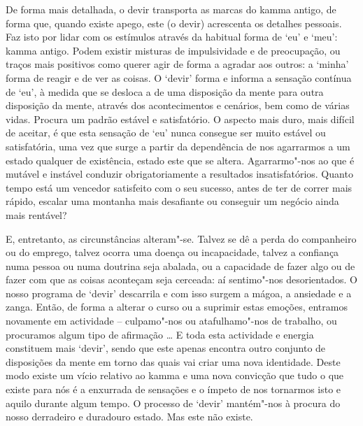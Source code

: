 De forma mais detalhada, o devir transporta as marcas do kamma antigo, de forma
que, quando existe apego, este (o devir) acrescenta os detalhes pessoais. Faz
isto por lidar com os estímulos através da habitual forma de `eu' e `meu': kamma
antigo. Podem existir misturas de impulsividade e de preocupação, ou traços mais
positivos como querer agir de forma a agradar aos outros: a `minha' forma de
reagir e de ver as coisas. O `devir' forma e informa a sensação contínua de
`eu', à medida que se desloca a de uma disposição da mente para outra disposição
da mente, através dos acontecimentos e cenários, bem como de várias vidas.
Procura um padrão estável e satisfatório. O aspecto mais duro, mais difícil de
aceitar, é que esta sensação de `eu' nunca consegue ser muito estável ou
satisfatória, uma vez que surge a partir da dependência de nos agarrarmos a um
estado qualquer de existência, estado este que se altera. Agarrarmo"-nos ao que
é mutável e instável conduzir obrigatoriamente a resultados insatisfatórios.
Quanto tempo está um vencedor satisfeito com o seu sucesso, antes de ter de
correr mais rápido, escalar uma montanha mais desafiante ou conseguir um negócio
ainda mais rentável?

E, entretanto, as circunstâncias alteram"-se. Talvez se dê a perda do
companheiro ou do emprego, talvez ocorra uma doença ou incapacidade, talvez a
confiança numa pessoa ou numa doutrina seja abalada, ou a capacidade de fazer
algo ou de fazer com que as coisas aconteçam seja cerceada: aí sentimo"-nos
desorientados. O nosso programa de `devir' descarrila e com isso surgem a mágoa,
a ansiedade e a zanga. Então, de forma a alterar o curso ou a suprimir estas
emoções, entramos novamente em actividade -- culpamo"-nos ou atafulhamo"-nos de
trabalho, ou procuramos algum tipo de afirmação \ldots{} E toda esta actividade
e energia constituem mais `devir', sendo que este apenas encontra outro conjunto
de disposições da mente em torno das quais vai criar uma nova identidade. Deste
modo existe um vício relativo ao kamma e uma nova convicção que tudo o que
existe para nós é a enxurrada de sensações e o ímpeto de nos tornarmos isto e
aquilo durante algum tempo. O processo de `devir' mantém"-nos à procura do nosso
derradeiro e duradouro estado. Mas este não existe.


